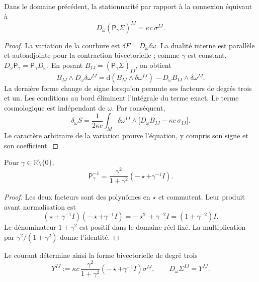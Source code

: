 \begin{theorem}
\label{vii:thm:ecuacion-cartan-holst}
Dans le domaine précédent, la stationnarité par rapport à la connexion
équivaut à
\begin{equation}
 D_\omega(\mathsf P_\gamma\Sigma)^{IJ}
       =\kappa c\,\sigma^{IJ}.
 \label{vii:eq:ecuacion-cartan-holst}
\end{equation}
\end{theorem}
\begin{proof}
La variation de la courbure est
\(\delta F=D_\omega\delta\omega\). La dualité interne est parallèle
et autoadjointe pour la contraction bivectorielle ; comme \(\gamma\) est
constant, \(D_\omega\mathsf P_\gamma=\mathsf P_\gamma D_\omega\).
En posant \(B_{IJ}=(\mathsf P_\gamma\Sigma)_{IJ}\), on obtient
\[
 B_{IJ}\wedge D_\omega\delta\omega^{IJ}
 =\mathrm d(B_{IJ}\wedge\delta\omega^{IJ})
   -D_\omega B_{IJ}\wedge\delta\omega^{IJ}.
\]
La dernière forme change de signe lorsqu'on permute ses facteurs de degrés trois
et un. Les conditions au bord éliminent l'intégrale du terme
exact. Le terme cosmologique est indépendant de \(\omega\).
Par conséquent,
\[
 \delta_\omega S=
 \frac1{2\kappa c}\int_M\delta\omega^{IJ}\wedge
       \bigl[D_\omega B_{IJ}-\kappa c\,\sigma_{IJ}\bigr].
\]
Le caractère arbitraire de la variation prouve l'équation, y compris son signe et son coefficient.
\end{proof}

\begin{lemma}
\label{vii:lem:inversa-holst}
Pour \(\gamma\in\mathbb R\setminus\{0\}\),
\begin{equation}
 \mathsf P_\gamma^{-1}
 =\frac{\gamma^2}{1+\gamma^2}
                      (-\star+\gamma^{-1}I).
 \label{vii:eq:inversa-holst}
\end{equation}
\end{lemma}
\begin{proof}
Les deux facteurs sont des polynômes en \(\star\) et commutent. Leur produit
avant normalisation est
\[
 (\star+\gamma^{-1}I)(-\star+\gamma^{-1}I)
 =-\star^2+\gamma^{-2}I=(1+\gamma^{-2})I.
\]
Le dénominateur \(1+\gamma^2\) est positif dans le domaine réel fixé. La multiplication par \(\gamma^2/(1+\gamma^2)\) donne l'identité.
\end{proof}

Le courant détermine ainsi la forme bivectorielle de degré trois
\begin{equation}
 Y^{IJ}:=\kappa c\,
   \frac{\gamma^2}{1+\gamma^2}
   (-\star+\gamma^{-1}I)\sigma^{IJ},
 \qquad D_\omega\Sigma^{IJ}=Y^{IJ}.
 \label{vii:eq:corriente-dualizada}
\end{equation}

